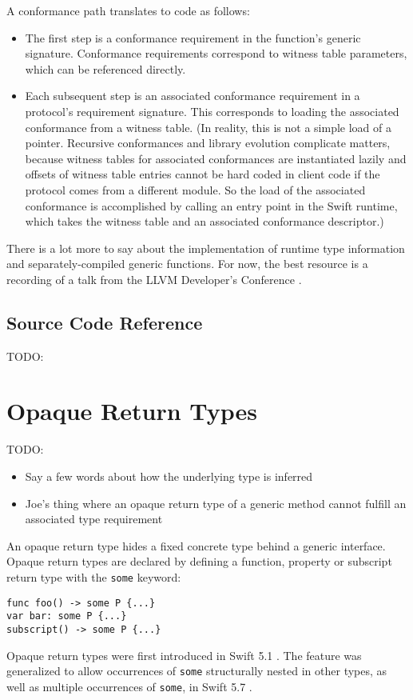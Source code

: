 \documentclass[a4paper,headsepline,bibliography=totoc,toc=flat,fleqn,twoside=semi]{scrbook}
\theoremstyle{definition}
\theoremstyle{definition}
\theoremstyle{definition}
\newcommand{\ifWIP}{\iffalse}
\begin{document}
A conformance path translates to code as follows:
\begin{itemize}
\item The first step is a conformance requirement in the function's generic signature. Conformance requirements correspond to witness table parameters, which can be referenced directly.
\item Each subsequent step is an associated conformance requirement in a protocol's requirement signature. This corresponds to loading the associated conformance from a witness table. (In reality, this is not a simple load of a pointer. Recursive conformances and library evolution complicate matters, because witness tables for associated conformances are instantiated lazily and offsets of witness table entries cannot be hard coded in client code if the protocol comes from a different module. So the load of the associated conformance is accomplished by calling an entry point in the Swift runtime, which takes the witness table and an associated conformance descriptor.)
\end{itemize}

There is a lot more to say about the implementation of runtime type information and separately-compiled generic functions. For now, the best resource is a recording of a talk from the LLVM Developer's Conference \cite{llvmtalk}.

\section{Source Code Reference}

TODO:
\fi

\chapter{Opaque Return Types}\label{opaqueresult}

\ifWIP

TODO:
\begin{itemize}
\item Say a few words about how the underlying type is inferred
\item Joe's thing where an opaque return type of a generic method cannot fulfill an associated type requirement
\end{itemize}

An opaque return type hides a fixed concrete type behind a generic interface. Opaque return types are declared by defining a function, property or subscript return type with the \texttt{some} keyword:
\begin{Verbatim}
func foo() -> some P {...}
var bar: some P {...}
subscript() -> some P {...}
\end{Verbatim}
Opaque return types were first introduced in Swift 5.1 \cite{se0244}. The feature was generalized to allow occurrences of \texttt{some} structurally nested in other types, as well as multiple occurrences of \texttt{some}, in Swift 5.7 \cite{se0328}.
\end{document}
